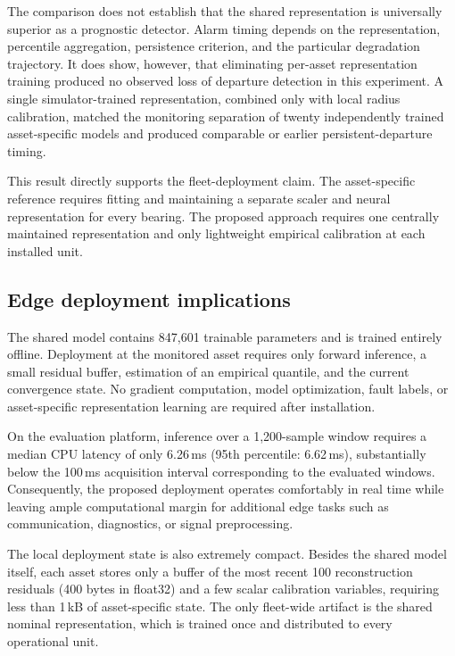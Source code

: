 \documentclass[11pt,a4paper]{article}
\begin{document}
The comparison does not establish that the shared representation is
universally superior as a prognostic detector. Alarm timing depends on the
representation, percentile aggregation, persistence criterion, and the
particular degradation trajectory. It does show, however, that eliminating
per-asset representation training produced no observed loss of departure
detection in this experiment. A single simulator-trained representation,
combined only with local radius calibration, matched the monitoring
separation of twenty independently trained asset-specific models and
produced comparable or earlier persistent-departure timing.

This result directly supports the fleet-deployment claim. The
asset-specific reference requires fitting and maintaining a separate scaler
and neural representation for every bearing. The proposed approach requires
one centrally maintained representation and only lightweight empirical
calibration at each installed unit.

\subsection{Edge deployment implications}
\label{sec:edge-results}

The shared model contains 847,601 trainable parameters and is trained entirely offline.
Deployment at the monitored asset requires only forward inference, a small residual buffer,
estimation of an empirical quantile, and the current convergence state.
No gradient computation, model optimization, fault labels, or asset-specific representation
learning are required after installation.

On the evaluation platform, inference over a 1,200-sample window requires a median CPU latency
of only 6.26\,ms (95th percentile: 6.62\,ms), substantially below the 100\,ms acquisition
interval corresponding to the evaluated windows. Consequently, the proposed deployment operates
comfortably in real time while leaving ample computational margin for additional edge tasks such
as communication, diagnostics, or signal preprocessing.

The local deployment state is also extremely compact. Besides the shared model itself, each asset
stores only a buffer of the most recent 100 reconstruction residuals (400 bytes in float32) and
a few scalar calibration variables, requiring less than 1\,kB of asset-specific state. The only
fleet-wide artifact is the shared nominal representation, which is trained once and distributed
to every operational unit.
\end{document}
